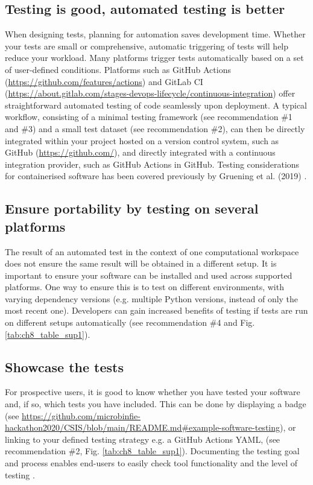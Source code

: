 \subsection{Testing is good, automated testing is better}

When designing tests, planning for automation saves development time. Whether your tests are small or comprehensive, automatic triggering of tests will help reduce your workload. Many platforms trigger tests automatically based on a set of user-defined conditions. Platforms such as GitHub Actions (\url{https://github.com/features/actions}) and GitLab CI (\url{https://about.gitlab.com/stages-devops-lifecycle/continuous-integration}) offer straightforward automated testing of code seamlessly upon deployment. A typical workflow, consisting of a minimal testing framework (see recommendation \#1 and \#3) and a small test dataset (see recommendation \#2), can then be directly integrated within your project hosted on a version control system, such as GitHub (\url{https://github.com/}), and directly integrated with a continuous integration provider, such as GitHub Actions in GitHub. Testing considerations for containerised software has been covered previously by Gruening et al. (2019) \cite{gruening_recommendations_2019}.

\subsection{Ensure portability by testing on several platforms}

The result of an automated test in the context of one computational workspace does not ensure the same result will be obtained in a different setup. It is important to ensure your software can be installed and used across supported platforms. One way to ensure this is to test on different environments, with varying dependency versions (e.g. multiple Python versions, instead of only the most recent one). Developers can gain increased benefits of testing if tests are run on different setups automatically (see recommendation \#4 and Fig. \ref{tab:ch8_table_sup1}).

\subsection{Showcase the tests}

For prospective users, it is good to know whether you have tested your software and, if so, which tests you have included. This can be done by displaying a badge \cite{trockman_adding_2018} (see \url{https://github.com/microbinfie-hackathon2020/CSIS/blob/main/README.md#example-software-testing}), or linking to your defined testing strategy e.g. a GitHub Actions YAML, (see recommendation \#2, Fig. \ref{tab:ch8_table_sup1}). Documenting the testing goal and process enables end-users to easily check tool functionality and the level of testing \cite{karimzadeh_top_2018}.

